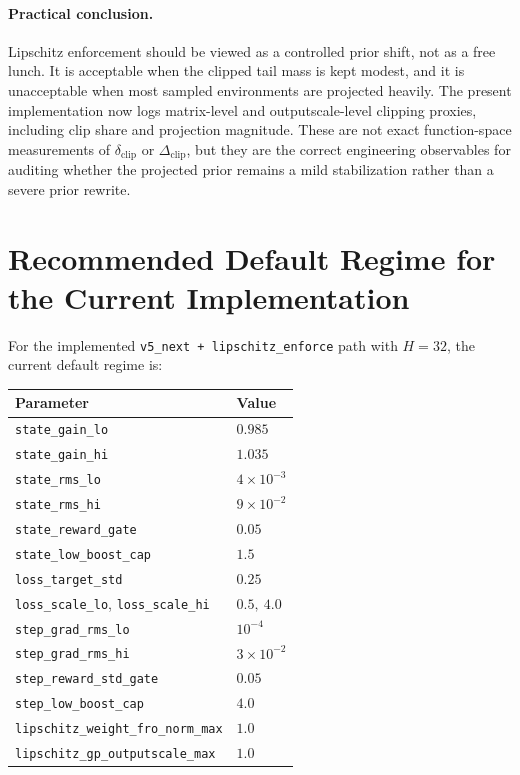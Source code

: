 \documentclass[11pt]{article}
\newcommand{\1}{\mathbf{1}}
\begin{document}
\paragraph{Practical conclusion.}
Lipschitz enforcement should be viewed as a controlled prior shift, not as a free lunch. It is acceptable when the clipped tail mass is kept modest, and it is unacceptable when most sampled environments are projected heavily. The present implementation now logs matrix-level and outputscale-level clipping proxies, including clip share and projection magnitude. These are not exact function-space measurements of $\delta_{\mathrm{clip}}$ or $\Delta_{\mathrm{clip}}$, but they are the correct engineering observables for auditing whether the projected prior remains a mild stabilization rather than a severe prior rewrite.

\section{Recommended Default Regime for the Current Implementation}
For the implemented \texttt{v5\_next + lipschitz\_enforce} path with $H=32$, the current default regime is:
\begin{center}
\begin{tabular}{ll}
\toprule
Parameter & Value \\
\midrule
\texttt{state\_gain\_lo} & $0.985$ \\
\texttt{state\_gain\_hi} & $1.035$ \\
\texttt{state\_rms\_lo} & $4\times 10^{-3}$ \\
\texttt{state\_rms\_hi} & $9\times 10^{-2}$ \\
\texttt{state\_reward\_gate} & $0.05$ \\
\texttt{state\_low\_boost\_cap} & $1.5$ \\
\texttt{loss\_target\_std} & $0.25$ \\
\texttt{loss\_scale\_lo}, \texttt{loss\_scale\_hi} & $0.5,\ 4.0$ \\
\texttt{step\_grad\_rms\_lo} & $10^{-4}$ \\
\texttt{step\_grad\_rms\_hi} & $3\times 10^{-2}$ \\
\texttt{step\_reward\_std\_gate} & $0.05$ \\
\texttt{step\_low\_boost\_cap} & $4.0$ \\
\texttt{lipschitz\_weight\_fro\_norm\_max} & $1.0$ \\
\texttt{lipschitz\_gp\_outputscale\_max} & $1.0$ \\
\bottomrule
\end{tabular}
\end{center}
\end{document}
